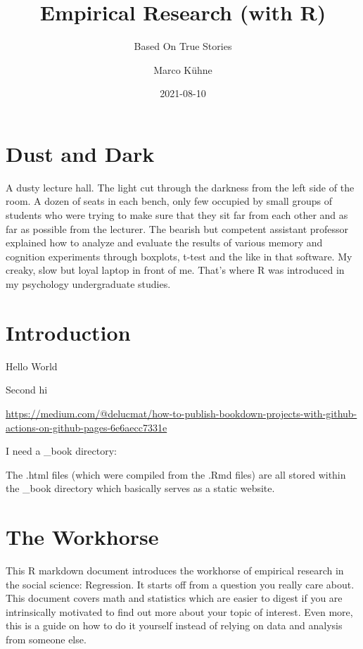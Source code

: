 \documentclass[
]{book}
\title{Empirical Research (with R)}
\subtitle{Based On True Stories}
\author{Marco Kühne}
\date{2021-08-10}
\begin{document}
\maketitle

{
\setcounter{tocdepth}{1}
\tableofcontents
}
\hypertarget{dust-and-dark}{%
\chapter*{Dust and Dark}\label{dust-and-dark}}

A dusty lecture hall. The light cut through the darkness from the left side of the room. A dozen of seats in each bench, only few occupied by small groups of students who were trying to make sure that they sit far from each other and as far as possible from the lecturer. The bearish but competent assistant professor explained how to analyze and evaluate the results of various memory and cognition experiments through boxplots, t-test and the like in that software. My creaky, slow but loyal laptop in front of me. That's where R was introduced in my psychology undergraduate studies.

\hypertarget{introduction}{%
\chapter{Introduction}\label{introduction}}

Hello World

Second hi

\url{https://medium.com/@delucmat/how-to-publish-bookdown-projects-with-github-actions-on-github-pages-6e6aecc7331e}

I need a \_book directory:

The .html files (which were compiled from the .Rmd files) are all stored within the \_book directory which basically serves as a static website.

\hypertarget{the-workhorse}{%
\chapter{The Workhorse}\label{the-workhorse}}

This R markdown document introduces the workhorse of empirical research in the social science: Regression. It starts off from a question you really care about. This document covers math and statistics which are easier to digest if you are intrinsically motivated to find out more about your topic of interest. Even more, this is a guide on how to do it yourself instead of relying on data and analysis from someone else.
\end{document}
